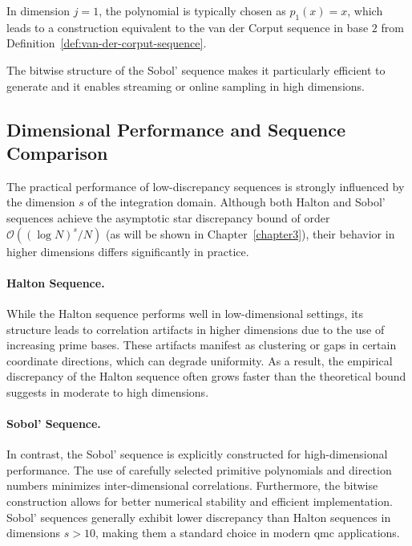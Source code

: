 \begin{remark}
In dimension $j = 1$, the polynomial is typically chosen as $p_1(x) = x$, which
leads to a construction equivalent to the van der Corput sequence in base $2$
from Definition~\ref{def:van-der-corput-sequence}.
\end{remark}

The bitwise structure of the Sobol' sequence makes it particularly efficient to
generate and it enables streaming or online sampling in high dimensions.

\subsection{Dimensional Performance and Sequence Comparison}
\label{subsec:dimensional-performance}

The practical performance of low-discrepancy sequences is strongly influenced by
the dimension $s$ of the integration domain. Although both Halton and Sobol'
sequences achieve the asymptotic star discrepancy bound of order
$\mathcal{O}((\log N)^s / N)$ (as will be shown in Chapter~\ref{chapter3}),
their behavior in higher dimensions differs significantly in practice.

\paragraph{Halton Sequence.}
While the Halton sequence performs well in low-dimensional settings, its
structure leads to correlation artifacts in higher dimensions due to the use of
increasing prime bases. These artifacts manifest as clustering or gaps in
certain coordinate directions, which can degrade uniformity. As a result, the
empirical discrepancy of the Halton sequence often grows faster than the
theoretical bound suggests in moderate to high dimensions.

\paragraph{Sobol' Sequence.}
In contrast, the Sobol' sequence is explicitly constructed for high-dimensional
performance. The use of carefully selected primitive polynomials and direction
numbers minimizes inter-dimensional correlations. Furthermore, the bitwise
construction allows for better numerical stability and efficient implementation.
Sobol' sequences generally exhibit lower discrepancy than Halton sequences in
dimensions $s > 10$, making them a standard choice in modern \ac{qmc}
applications.

